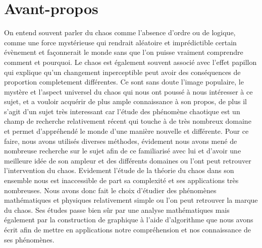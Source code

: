 \chapter*{Avant-propos}
On entend souvent parler du chaos comme l'absence d'ordre ou de logique, comme une force mystérieuse qui 
rendrait aléatoire et imprédictible certain évènement et façonnerait le monde sans que l'on puisse vraiment comprendre comment et pourquoi. Le chaos est également souvent associé avec l'effet papillon 
qui explique qu'un changement inperceptible peut avoir des conséquences de proportion completement différentes.
Ce sont sans doute l'image populaire, le mystère et l'aspect universel du chaos qui nous ont poussé à nous intéresser à ce sujet, 
et a vouloir acquérir de plus ample connaissance à son propos, de plus il s'agit d'un sujet très interessant car l'étude des phénomène 
chaotique est un champ de recherche relativement récent qui touche à de très nombreux domaine et permet d'appréhendé le monde d'une manière nouvelle et différente.
 Pour ce faire, nous avons utilisés diverses méthodes, évidement 
nous avons mené de nombreuse recherche sur le sujet afin de ce familiarisé avec lui et d'avoir une meilleure idée de son ampleur
et des différents domaines ou l'ont peut retrouver l'intervention du chaos. Evidement l'étude de la théorie du chaos dans son ensemble
nous est inaccessible de part sa complexité et ses applications très nombreuses. Nous avons donc fait le choix d'étudier des phénomènes
mathématiques et physiques relativement simple ou l'on peut retrouver la marque du chaos. Ses études passe bien sûr par une analyse mathématiques
mais également par la construction de graphique à l'aide d'algorithme que nous avons écrit afin de mettre en applications notre compréhension 
et nos connaissance de ses phénomènes.

